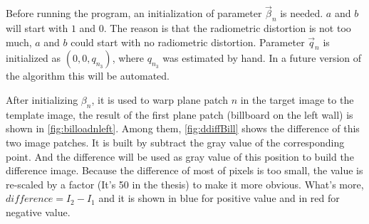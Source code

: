 Before running the program, an initialization of parameter $\vec{\beta}_n$ is needed. $a$ and $b$ will start with $1$ and $0$. The reason is that the radiometric distortion is not too much, $a$ and $b$ could start with no radiometric distortion. Parameter $\vec{q}_n$ is initialized as $(0, 0, q_{n_3})$, where $q_{n_3}$ was estimated by hand. In a future version of the algorithm this will be automated.

After initializing $\beta_n$, it is used to warp plane patch $n$ in the target image to the template image, the result of the first plane patch (billboard on the left wall) is shown in \cref{fig:billoadnleft}. Among them, \cref{fig:ddiffBill} shows the difference of this two image patches. It is built by subtract the gray value of the corresponding point. And the difference will be used as gray value of this position to build the difference image. Because the difference of most of pixels is too small, the value is re-scaled by a factor (It's 50 in the thesis) to make it more obvious. What's more, $ difference = I_2 - I_1$ and it is shown in blue for positive value and in red for negative value. 
